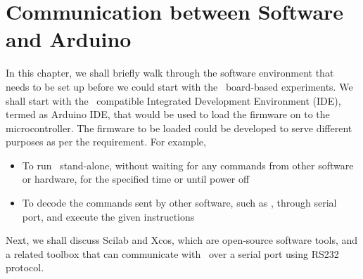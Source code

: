 \chapter{Communication between Software and Arduino}
\thispagestyle{empty}
\label{sec:sw-env}

\newcommand{\LocSWfig}{\Origin/user-code/sw-env/figures}
\newcommand{\LocSWscicode}{\Origin/user-code/sw-env/scilab}
\newcommand{\LocSWscibrief}[1]{{\texttt
                  Origin/user-code/sw-env/scilab/#1}, see \fnrefp{fn:file-loc}}
\newcommand{\LocSWardcode}{\Origin/user-code/sw-env/arduino}
\newcommand{\LocSWardbrief}[1]{{\tt \seqsplit{
                        Origin/user-code/sw-env/arduino/#1}}, see \fnrefp{fn:file-loc}}

\newcommand{\LocSWchkcode}{\Origin/tools}
\newcommand{\LocSWchkbrief}[1]{{\tt \seqsplit{
                        Origin/tools/#1}}, see \fnrefp{fn:file-loc}}
\newcommand{\LocSWfirmcode}{\Origin/tools/arduino-firmware}
\newcommand{\LocSWfirmbrief}[1]{{\tt \seqsplit{
                        Origin/tools/arduino-firmware/#1}}, see \fnrefp{fn:file-loc}}

\newcommand{\LocFIMpycode}{\Origin/user-code/led/python}  %
\newcommand{\LocFIMpybrief}[1]{{\tt \seqsplit{%
                        Origin/user-code/led/python/#1}}, see \fnrefp{fn:file-loc}} %


\newcommand{\LocFIMjuliacode}{\Origin/user-code/led/julia}  %
\newcommand{\LocFIMjuliabrief}[1]{{\tt \seqsplit{%
                        Origin/user-code/led/julia/#1}}, see \fnrefp{fn:file-loc}} %

\newcommand{\LocFIMOpenModelicacode}{\Origin/user-code/led/OpenModelica}  %
\newcommand{\LocFIMOpenModelicabrief}[1]{{\tt \seqsplit{%
                        Origin/user-code/led/OpenModelica/#1}}, see \fnrefp{fn:file-loc}} %



In this chapter, we shall briefly walk through the software
environment that needs to be set up before we could start with the
\arduino\ board-based experiments. We shall start with the \arduino\
compatible Integrated Development Environment (IDE), termed as Arduino
IDE, that would be used to load the firmware on to the
microcontroller. The firmware to be loaded could be developed to serve
different purposes as per the requirement. For example, 
\begin{itemize}
      \item To run \arduino\ stand-alone, without waiting for any commands
            from other software or hardware, for the specified time or until
            power off
      \item To decode the commands sent by other software, such as \scilab,
            through serial port, and execute the given instructions
\end{itemize}
Next, we shall discuss Scilab and Xcos, which are open-source software
tools, and a related toolbox that can communicate with \arduino\ 
over a serial port using RS232 protocol.

